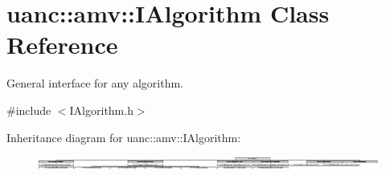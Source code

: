 \hypertarget{classuanc_1_1amv_1_1_i_algorithm}{}\section{uanc\+:\+:amv\+:\+:I\+Algorithm Class Reference}
\label{classuanc_1_1amv_1_1_i_algorithm}


General interface for any algorithm.  




{\ttfamily \#include $<$I\+Algorithm.\+h$>$}

Inheritance diagram for uanc\+:\+:amv\+:\+:I\+Algorithm\+:\begin{figure}[H]
\begin{center}
\leavevmode
\includegraphics[height=0.429942cm]{classuanc_1_1amv_1_1_i_algorithm}
\end{center}
\end{figure}
